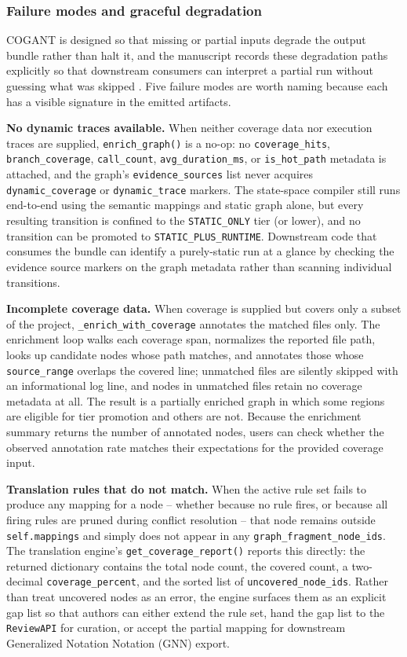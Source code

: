 \documentclass[
]{article}
\begin{document}
\subsubsection{Failure modes and graceful
degradation}\label{failure-modes-and-graceful-degradation}

COGANT is designed so that missing or partial inputs degrade the output
bundle rather than halt it, and the manuscript records these degradation
paths explicitly so that downstream consumers can interpret a partial
run without guessing what was skipped \citep{peng2011reproducible}. Five
failure modes are worth naming because each has a visible signature in
the emitted artifacts.

\textbf{No dynamic traces available.} When neither coverage data nor
execution traces are supplied, \texttt{enrich\_graph()} is a no-op: no
\texttt{coverage\_hits}, \texttt{branch\_coverage},
\texttt{call\_count}, \texttt{avg\_duration\_ms}, or
\texttt{is\_hot\_path} metadata is attached, and the graph's
\texttt{evidence\_sources} list never acquires
\texttt{dynamic\_coverage} or \texttt{dynamic\_trace} markers. The
state-space compiler still runs end-to-end using the semantic mappings
and static graph alone, but every resulting transition is confined to
the \texttt{STATIC\_ONLY} tier (or lower), and no transition can be
promoted to \texttt{STATIC\_PLUS\_RUNTIME}. Downstream code that
consumes the bundle can identify a purely-static run at a glance by
checking the evidence source markers on the graph metadata rather than
scanning individual transitions.

\textbf{Incomplete coverage data.} When coverage is supplied but covers
only a subset of the project, \texttt{\_enrich\_with\_coverage}
annotates the matched files only. The enrichment loop walks each
coverage span, normalizes the reported file path, looks up candidate
nodes whose path matches, and annotates those whose
\texttt{source\_range} overlaps the covered line; unmatched files are
silently skipped with an informational log line, and nodes in unmatched
files retain no coverage metadata at all. The result is a partially
enriched graph in which some regions are eligible for tier promotion and
others are not. Because the enrichment summary returns the number of
annotated nodes, users can check whether the observed annotation rate
matches their expectations for the provided coverage input.

\textbf{Translation rules that do not match.} When the active rule set
fails to produce any mapping for a node -- whether because no rule
fires, or because all firing rules are pruned during conflict resolution
-- that node remains outside \texttt{self.mappings} and simply does not
appear in any \texttt{graph\_fragment\_node\_ids}. The translation
engine's \texttt{get\_coverage\_report()} reports this directly: the
returned dictionary contains the total node count, the covered count, a
two-decimal \texttt{coverage\_percent}, and the sorted list of
\texttt{uncovered\_node\_ids}. Rather than treat uncovered nodes as an
error, the engine surfaces them as an explicit gap list so that authors
can either extend the rule set, hand the gap list to the
\texttt{ReviewAPI} for curation, or accept the partial mapping for
downstream Generalized Notation Notation (GNN) export.
\end{document}
